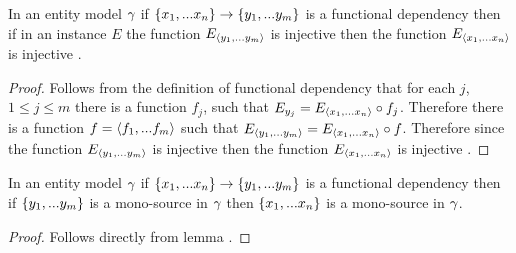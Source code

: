 \begin{lemma}
In an entity model $\gamma$ if $\left\{x_1,...x_n\right\} \rightarrow \left\{y_1,...y_{m}\right\}$ is a functional dependency then if in an instance $E$ the function $E_{\langle y_1,...y_{m}\rangle}$ is injective  then the function $E_{\langle x_1,...x_n\rangle}$  is injective .
\end{lemma}
\begin{proof}
Follows from the definition of functional dependency that for each $j$, $1 \leq j \leq m$  there is a function ${f_j}$,  such that
$E_{y_j}=E_{\langle x_1,...x_n\rangle}\circ f_j$. Therefore there is a function $f=\langle f_1,...f_m\rangle$ such that
$E_{\langle y_1,...y_m\rangle}= E_{\langle x_1,...x_n\rangle}\circ f $. Therefore since  the function $E_{\langle y_1,...y_{m}\rangle}$ is 
injective  then the function $E_{\langle x_1,...x_n\rangle}$  is injective .
\end{proof}

\begin{newtt}
\begin{lemma}
In an entity model $\gamma$ if $\left\{x_1,...x_n\right\} \rightarrow \left\{y_1,...y_{m}\right\}$ is a functional dependency then if 
$\left\{y_1,...y_{m}\right\}$  is a mono-source in $\gamma$ then $\left\{x_1,...x_n\right\}$ is a mono-source in $\gamma$.
\end{lemma}
\begin{proof}
Follows directly from lemma .
\end{proof}
\end{newtt}


